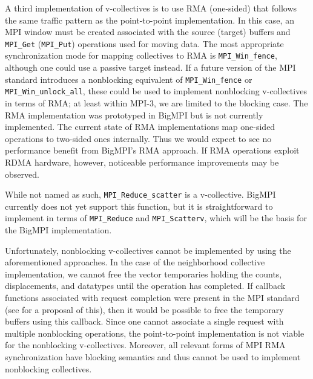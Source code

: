 A third implementation of v-collectives is to use RMA (one-sided) that follows
the same traffic pattern as the point-to-point implementation.
In this case, an MPI window must be created associated with the source (target)
buffers and \texttt{MPI\_Get} (\texttt{MPI\_Put}) operations used for moving data.
The most appropriate synchronization mode for mapping collectives to RMA
is \texttt{MPI\_Win\_fence}, although one could use a passive target instead.
If a future version of the MPI standard introduces a nonblocking
equivalent of \texttt{MPI\_Win\_fence} or \texttt{MPI\_Win\_unlock\_all}, these
could be used to implement nonblocking v-collectives in terms of RMA; 
at least within MPI-3, we are limited to the blocking case.
The RMA implementation was prototyped in BigMPI but is not currently implemented.
The current state of RMA implementations map one-sided operations to two-sided ones internally. Thus we would expect to see no performance benefit from BigMPI's RMA approach.
If RMA operations exploit RDMA hardware, 
however, noticeable performance improvements may be
observed.

While not named as such, \texttt{MPI\_Reduce\_scatter} is a v-collective.
BigMPI currently does not yet support this function,
but it is straightforward to implement in terms of  \texttt{MPI\_Reduce} and
\texttt{MPI\_Scatterv}, which will be the basis for the BigMPI implementation.



Unfortunately, nonblocking v-collectives cannot be implemented by using the aforementioned approaches.
In the case of the neighborhood collective
implementation, we cannot free the vector temporaries holding the counts,
displacements, and datatypes until the operation has completed.
If callback functions associated with request completion were present in the
MPI standard (see \cite{ticket26} for a proposal of this), then it would
be possible to free the temporary buffers using this callback.
Since one cannot associate a single request with multiple
nonblocking operations, the point-to-point implementation is not viable
for the nonblocking v-collectives.
Moreover, all relevant forms of MPI RMA synchronization have blocking semantics
and thus cannot be used to implement nonblocking collectives.

